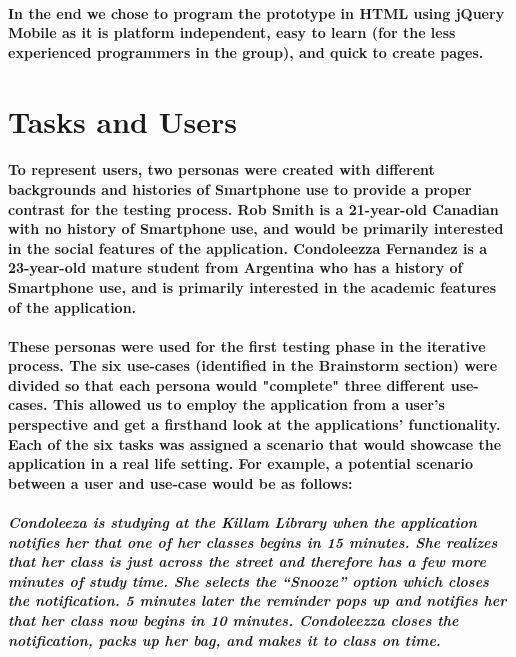 \documentclass{report}
\begin{document}
    \paragraph{In the end we chose to program the prototype in HTML using jQuery
    Mobile as it is platform independent, easy to learn (for the less experienced
    programmers in the group), and quick to create pages.}
\section{Tasks and Users}
    \paragraph{To represent users, two personas were created with different
    backgrounds and histories of Smartphone use to provide a proper contrast for the
    testing process. Rob Smith is a 21-year-old Canadian with no history of
    Smartphone use, and would be primarily interested in the social features of the
    application. Condoleezza Fernandez is a 23-year-old mature student from
    Argentina who has a history of Smartphone use, and is primarily interested in
    the academic features of the application.}
    \paragraph{These personas were used for the first testing phase in the
    iterative process. The six use-cases (identified in the Brainstorm section) were
    divided so that each persona would "complete" three different use-cases. This
    allowed us to employ the application from a user’s perspective and get a
    firsthand look at the applications' functionality. Each of the six tasks was
    assigned a scenario that would showcase the application in a real life setting.
    For example, a potential scenario between a user and use-case would be as
    follows:}
    \paragraph{\emph{Condoleeza is studying at the Killam Library when the
    application notifies her that one of her classes begins in 15 minutes. She
    realizes that her class is just across the street and therefore has a few more
    minutes of study time. She selects the “Snooze” option which closes the
    notification. 5 minutes later the reminder pops up and notifies her that her
    class now begins in 10 minutes. Condoleezza closes the notification, packs up
    her bag, and makes it to class on time.}}
\end{document}
